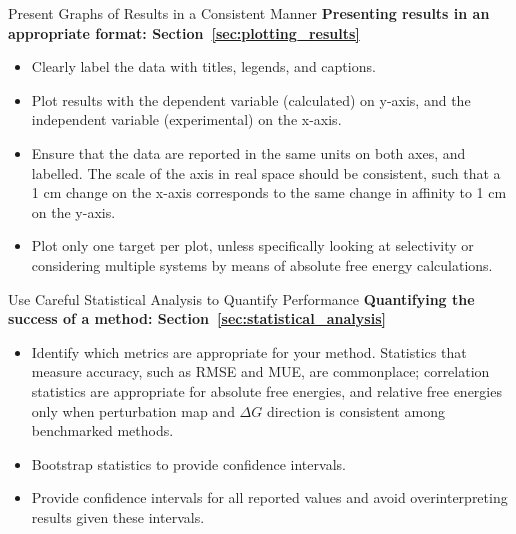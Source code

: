 \documentclass[9pt,bestpractices]{livecoms}
\begin{document}
\begin{Checklists*}[hp!]
\begin{checklist}{Present Graphs of Results in a Consistent Manner}
\textbf{Presenting results in an appropriate format: Section~\ref{sec:plotting_results}}
\begin{itemize}
\item Clearly label the data with titles, legends, and captions.
\item Plot results with the dependent variable (calculated) on y-axis, and the independent variable (experimental) on the x-axis. 
\item Ensure that the data are reported in the same units on both axes, and labelled. The scale of the axis in real space should be consistent, such that a 1 cm change on the x-axis corresponds to the same change in affinity to 1 cm on the y-axis.
\item Plot only one target per plot, unless specifically looking at selectivity or considering multiple systems by means of absolute free energy calculations.
\end{itemize}
\end{checklist}

\begin{checklist}{Use Careful Statistical Analysis to Quantify Performance}
\textbf{Quantifying the success of a method: Section~\ref{sec:statistical_analysis}}
\begin{itemize}
\item Identify which metrics are appropriate for your method. Statistics that measure accuracy, such as RMSE and MUE, are commonplace; correlation statistics are appropriate for absolute free energies, and relative free energies only when perturbation map and $\Delta G$ direction is consistent among benchmarked methods.
\item Bootstrap statistics to provide confidence intervals. 
\item Provide confidence intervals for all reported values and avoid overinterpreting results given these intervals.
\end{itemize}
\end{checklist}


\end{Checklists*}
\end{document}

